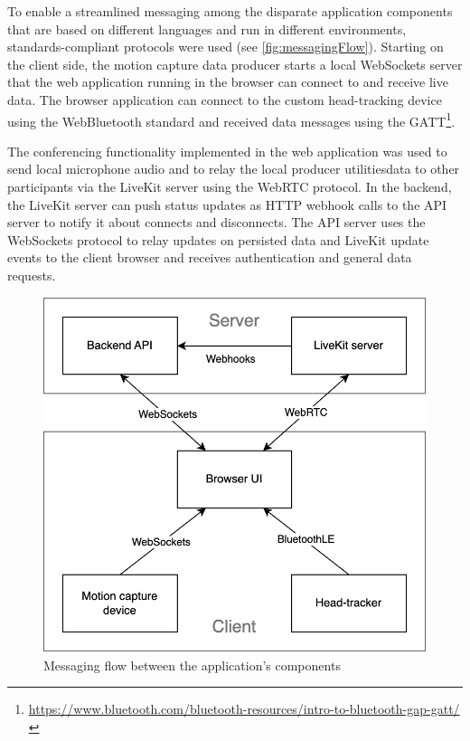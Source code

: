 To enable a streamlined messaging among the disparate application components that are based on different languages and run in different environments, standards-compliant protocols were used (see \autoref{fig:messagingFlow}).
Starting on the client side, the motion capture data producer starts a local WebSockets server that the web application running in the browser can connect to and receive live data.
The browser application can connect to the custom head-tracking device using the WebBluetooth standard and received data messages using the \ac{GATT}\footnote{\url{https://www.bluetooth.com/bluetooth-resources/intro-to-bluetooth-gap-gatt/}}.

The conferencing functionality implemented in the web application was used to send local microphone audio and to relay the local producer utilities\textquotesingle data to other participants via the LiveKit server using the WebRTC protocol.
In the backend, the LiveKit server can push status updates as \ac{HTTP} webhook calls to the \ac{API} server to notify it about connects and disconnects.
The \ac{API} server uses the WebSockets protocol to relay updates on persisted data and LiveKit update events to the client browser and receives authentication and general data requests.

\begin{figure}[h]
\centering
\includegraphics[scale=0.4]{04_Artefakte/01_Abbildungen/application-messaging-flow}
\caption[Application messaging flow]{Messaging flow between the application's components\protect}
\label{fig:messagingFlow}
\end{figure}

